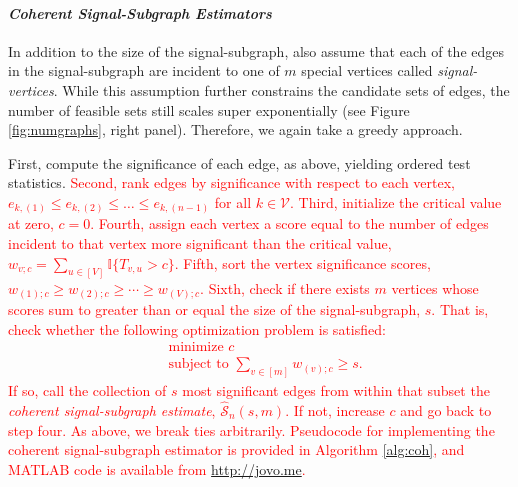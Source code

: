 \documentclass[10pt,journal,cspaper,compsoc]{IEEEtran}
\providecommand{\tr}[1]{\textcolor{red}{#1}}
\newcommand{\II}{\mathbb{I}}           %
\providecommand{\mc}[1]{\mathcal{#1}}
\providecommand{\mhc}[1]{\widehat{\mathcal{#1}}}
\begin{document}
\paragraph{\emph{Coherent Signal-Subgraph Estimators}}

In addition to the size of the signal-subgraph, also assume that each of the edges in the signal-subgraph are incident to one of $m$ special vertices called \emph{signal-vertices}. While this assumption further constrains the candidate sets of edges, the number of feasible sets still scales super exponentially (see Figure \ref{fig:numgraphs}, right panel).  Therefore, we again take a greedy approach.  

First, compute the significance of each edge, as above, yielding ordered test statistics. \tr{Second, rank edges by significance with respect to each vertex,  $e_{k,(1)} \leq e_{k,(2)} \leq \ldots \leq e_{k,(n-1)}$ for all $k \in \mc{V}$.  Third, initialize the critical value at zero, $c=0$. Fourth, assign each vertex a score equal to the number of edges incident to that vertex more significant than the critical value, $w_{v;c}=\sum_{u \in [V]} \II\{T_{v,u} > c\}$.  
Fifth, sort the vertex significance scores, $w_{(1);c} \geq w_{(2); c} \geq \cdots \geq w_{(V);c}$.
Sixth, check if there exists $m$ vertices whose scores sum to greater than or equal the size of the signal-subgraph, $s$.  That is, check whether the following optimization problem is satisfied:
\begin{align} \label{eq:coh}
	&\text{minimize } c \nonumber \\
	&\text{subject to } \sum_{v \in [m]} w_{(v);c}\geq s.
\end{align}
If so, call the collection of $s$ most significant edges from within that subset the \emph{coherent signal-subgraph estimate}, $\mhc{S}_n(s,m)$. %
If not, increase $c$ and go back to step four. 
As above, we break ties arbitrarily.
Pseudocode for implementing the coherent signal-subgraph estimator is provided in Algorithm \ref{alg:coh}, and MATLAB code is available from \url{http://jovo.me}.}
\end{document}
